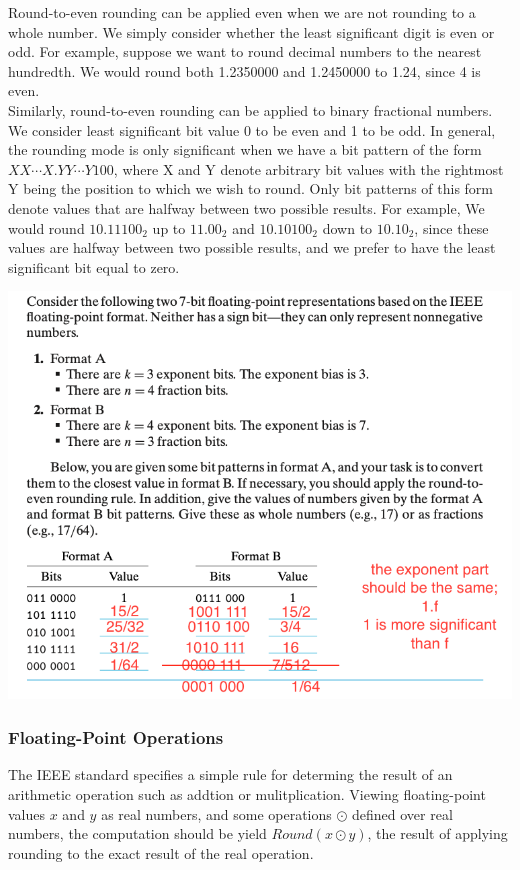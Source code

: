 \documentclass[11pt]{article}
\begin{document}
Round-to-even rounding can be applied even when we are not rounding to a whole number. We simply consider whether the least significant digit is even or odd. For example, suppose we want to round decimal numbers to the nearest hundredth. We would round both 1.2350000 and 1.2450000 to 1.24, since 4 is even.\\

Similarly, round-to-even rounding can be applied to binary fractional numbers. We consider least significant bit value 0 to be even and 1 to be odd. In general, the rounding mode is only significant when we have a bit pattern of the form \(XX\cdots  X.Y Y\cdots Y100\), where X and Y denote arbitrary bit values with the rightmost Y being the position to which we wish to round. Only bit patterns of this form denote values that are halfway between two possible results. For example, We would round \(10.11100_2\) up to \(11.00_2\) and \(10.10100_2\) down to \(10.10_2\), since these values are halfway between two possible results, and we prefer to have the least significant bit equal to zero.\\


\begin{center}
\includegraphics[width=.9\linewidth]{pics/good-rounding-example.png}
\end{center}



\subsubsection{Floating-Point Operations}
\label{sec:orgedab0de}
The IEEE standard specifies a simple rule for determing the result of an arithmetic operation such as addtion or mulitplication. Viewing floating-point values \(x\) and \(y\) as real numbers, and some operations \(\odot\) defined over real numbers, the computation should be yield \(Round(x\odot y)\), the result of applying rounding to the exact result of the real operation.\\
\end{document}

